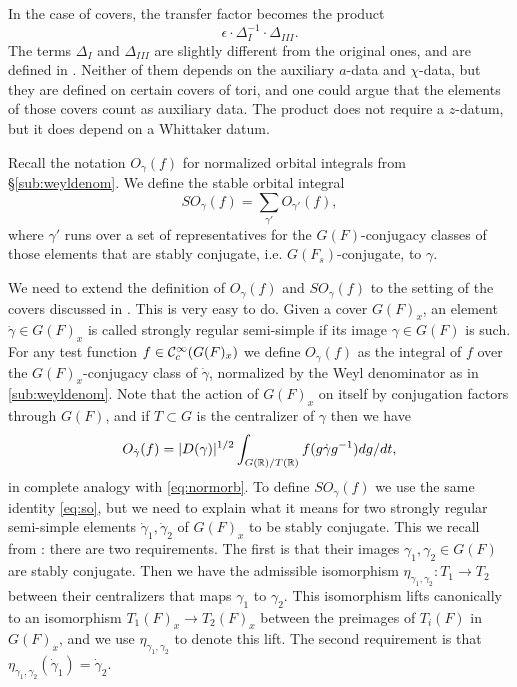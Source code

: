 \documentclass{article}
\theoremstyle{definition}
\numberwithin{equation}{section}
\renewcommand{\-}{\hyp{}}
\begin{document}
In the case of covers, the transfer factor becomes the product
\[ \epsilon \cdot \Delta_I^{-1} \cdot \Delta_{III}.\]
The terms $\Delta_I$ and $\Delta_{III}$ are slightly different from the original ones, and are defined in \cite[\S4.3]{KalHDC}. Neither of them depends on the auxiliary $a$-data and $\chi$-data, but they are defined on certain covers of tori, and one could argue that the elements of those covers count as auxiliary data. The product does not require a $z$-datum, but it does depend on a Whittaker datum.

Recall the notation $O_\gamma(f)$ for normalized orbital integrals from \S\ref{sub:weyldenom}. We define the stable orbital integral
\begin{equation} \label{eq:so}
	SO_\gamma(f) = \sum_{\gamma'} O_{\gamma'}(f),	
\end{equation}
where $\gamma'$ runs over a set of representatives for the $G(F)$-conjugacy classes of those elements that are stably conjugate, i.e. $G(F_s)$-conjugate, to $\gamma$.

We need to extend the definition of $O_\gamma(f)$ and $SO_\gamma(f)$ to the setting of the covers discussed in \cite{KalHDC}. This is very easy to do. Given a cover $G(F)_x$, an element $\dot\gamma \in G(F)_x$ is called strongly regular semi-simple if its image $\gamma \in G(F)$ is such. For any test function $f \in \mathcal{C}^\infty_c(G(F)_x)$ we define $O_{\dot\gamma}(f)$ as the integral of $f$ over the $G(F)_x$-conjugacy class of $\dot\gamma$, normalized by the Weyl denominator as in \ref{sub:weyldenom}. Note that the action of $G(F)_x$ on itself by conjugation factors through $G(F)$, and if $T \subset G$ is the centralizer of $\gamma$ then we have
\[ O_{\dot\gamma}(f) = |D(\gamma)|^{1/2}\int_{G(\mathbb{R})/T(\mathbb{R})} f(g\dot \gamma g^{-1})dg/dt, \]
in complete analogy with \eqref{eq:normorb}. To define $SO_{\dot\gamma}(f)$ we use the same identity \eqref{eq:so}, but we need to explain what it means for two strongly regular semi-simple elements $\dot\gamma_1,\dot\gamma_2$ of $G(F)_x$ to be stably conjugate. This we recall from \cite[\S3.8]{KalHDC}: there are two requirements. The first is that  their images $\gamma_1,\gamma_2 \in G(F)$ are stably conjugate. Then we have the admissible isomorphism $\eta_{\gamma_1,\gamma_2} : T_1 \to T_2$ between their centralizers that maps $\gamma_1$ to $\gamma_2$. This isomorphism lifts canonically to an isomorphism $T_1(F)_x \to T_2(F)_x$ between the preimages of $T_i(F)$ in $G(F)_x$, and we use $\eta_{\gamma_1,\gamma_2}$ to denote this lift. The second requirement is that $\eta_{\gamma_1,\gamma_2}(\dot\gamma_1)=\dot\gamma_2$.
\end{document}
